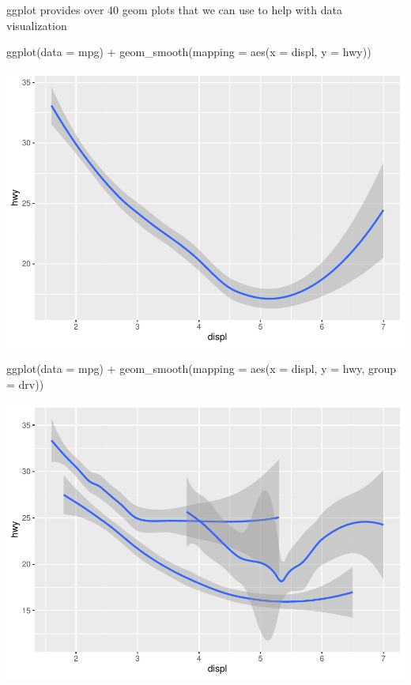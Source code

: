 \documentclass[
]{article}
\newenvironment{Shaded}{\begin{snugshade}}{\end{snugshade}}
\newcommand{\AttributeTok}[1]{\textcolor[rgb]{0.77,0.63,0.00}{#1}}
\newcommand{\FunctionTok}[1]{\textcolor[rgb]{0.00,0.00,0.00}{#1}}
\newcommand{\NormalTok}[1]{#1}
\newcommand{\SpecialCharTok}[1]{\textcolor[rgb]{0.00,0.00,0.00}{#1}}
\begin{document}
ggplot provides over 40 geom plots that we can use to help with data
visualization

\begin{Shaded}
\begin{Highlighting}[]
\FunctionTok{ggplot}\NormalTok{(}\AttributeTok{data =}\NormalTok{ mpg) }\SpecialCharTok{+}
  \FunctionTok{geom\_smooth}\NormalTok{(}\AttributeTok{mapping =} \FunctionTok{aes}\NormalTok{(}\AttributeTok{x =}\NormalTok{ displ, }\AttributeTok{y =}\NormalTok{ hwy))}
\end{Highlighting}
\end{Shaded}

\includegraphics{Journal_files/figure-latex/unnamed-chunk-48-1.pdf}

\begin{Shaded}
\begin{Highlighting}[]
\FunctionTok{ggplot}\NormalTok{(}\AttributeTok{data =}\NormalTok{ mpg) }\SpecialCharTok{+}
  \FunctionTok{geom\_smooth}\NormalTok{(}\AttributeTok{mapping =} \FunctionTok{aes}\NormalTok{(}\AttributeTok{x =}\NormalTok{ displ, }\AttributeTok{y =}\NormalTok{ hwy, }\AttributeTok{group =}\NormalTok{ drv))}
\end{Highlighting}
\end{Shaded}

\includegraphics{Journal_files/figure-latex/unnamed-chunk-48-2.pdf}
\end{document}
